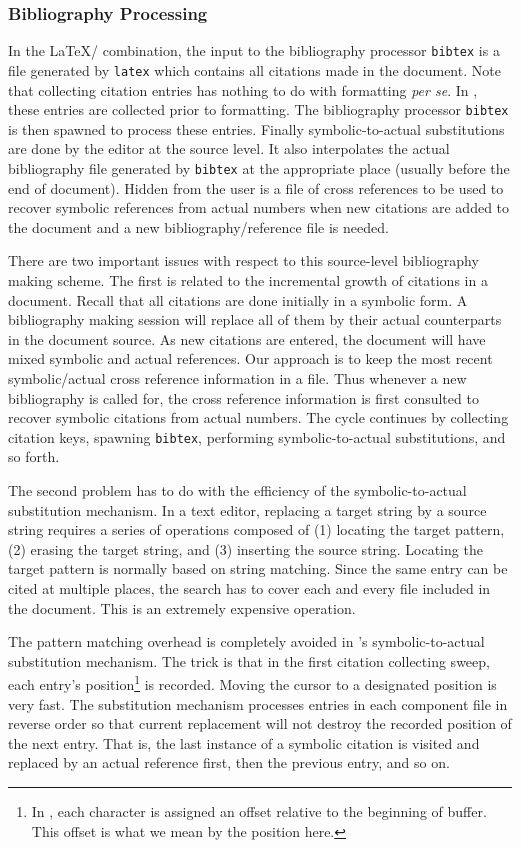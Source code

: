 \subsubsection{Bibliography Processing}
In the {\LaTeX}/{\BibTeX} combination, the input to the bibliography processor
\verb|bibtex| is a file generated by \verb|latex| which contains all citations
made in the document.  Note that collecting citation entries has nothing to do
with formatting {\it per se\/}.
In {\TM}, these entries are collected prior to formatting.
The bibliography processor \verb|bibtex| is then spawned to process these
entries.  Finally symbolic-to-actual substitutions are done by the editor
at the source level.  It also interpolates the actual
bibliography file generated by {\tt bibtex} at the appropriate place
(usually before the end of document).  Hidden from the user
is a file of cross references to be used to recover symbolic references
from actual numbers when new citations are added to the document
and a new bibliography/reference file is needed.

There are two important issues with respect to this source-level
bibliography making scheme.
The first is related to the incremental growth of citations in a document.
Recall that all citations are done initially in a symbolic form.
A {\TM} bibliography making session will replace all of them by their actual
counterparts in the document source.  As new citations are entered, the
document will have mixed symbolic and actual references.
Our approach is to keep the most recent symbolic/actual cross reference
information in a file.  Thus whenever a new bibliography is called for,
the cross reference information is first consulted to recover symbolic
citations from actual numbers.  The cycle continues by collecting
citation keys, spawning \verb|bibtex|, performing symbolic-to-actual
substitutions, and so forth.

The second problem has to do with the efficiency of the 
symbolic-to-actual substitution mechanism.
In a text editor, replacing a target string by a source string
requires a series of operations composed of
(1) locating the target pattern, (2) erasing the target string,
and (3) inserting the source string.  Locating the target
pattern is normally based on string matching.
Since the same entry can be cited at multiple places, the search has to cover
each and every file included in the document.  This is an extremely expensive
operation.

The pattern matching overhead is completely avoided in {\TM}'s
symbolic-to-actual substitution mechanism.  The trick is that in the
first citation collecting sweep, each entry's position\footnote{In
{\emacs}, each character is assigned an offset
relative to the beginning of buffer.  This offset is what we mean by
the position here.} is recorded.  Moving the cursor to a designated
position is very fast.  The substitution mechanism processes entries in each
component file in reverse order so that current replacement will not destroy
the recorded position of the next entry.  That is, the last instance of a
symbolic citation is visited and replaced by an actual reference first,
then the previous entry, and so on.

